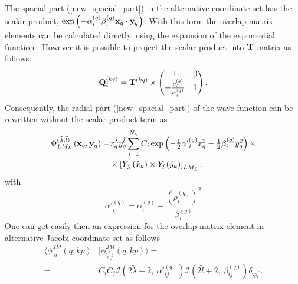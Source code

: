 \documentclass[
12pt, %
oneside, %
english, %
onehalfspacing, %
onehalfspacing, %
headsepline, %
]{MastersDoctoralThesis} %
\begin{document}
The spacial part (\ref{new_spacial_part}) in the alternative coordinate set has the scalar product, $\exp \left(- \alpha_i^{(q)} \beta_i^{(q)}  {\bf x}_q \cdot {\bf y}_q  \right)$. With this form the overlap matrix elements can be calculated directly, using the expansion of the exponential function \cite{suzuki1998stochastic}. However it is possible  to project the scalar product into ${\bf T}$ matrix \cite{kukulin1990dynamic} as follows:
 \begin{equation}
{\bf Q}_i^{(kq)}= {\bf T}^{(kq)} \times
\begin{pmatrix}
1 &  0 \\ 
-\tfrac{\rho^{(q)}_{i}}{\alpha^{(q)}_i} & 1
\end{pmatrix} .
\label{q_rotation_matrix}
\end{equation}
Consequently, the radial part (\ref{new_spacial_part}) of the wave function can be rewritten without the scalar product term as
\begin{align}
 \Phi_{LM_L}^{(\tilde{\lambda},\tilde{l}) } \left(  {\bf x}_q, {\bf y}_q \right)  =  &
x^{\tilde{\lambda}}_q y^{\tilde{l}}_q 
\sum_{i=1}^{N_\gamma} C_i 
\exp\left( - \tfrac{1}{2} 
{\alpha'}^{(q)}_{i}
 x^2_q -\tfrac{1}{2}  \beta_i^{(q)} y^2_q \right)
\times \nonumber \\
& \times \left[ 
Y_{\tilde{\lambda}} \left(\hat{x}_k \right) \times Y_{\tilde{l}} \left(\hat{y}_k \right)
\right]_{LM_L}.
\label{new_spacial_part}
\end{align}
with 
\begin{equation}
{\alpha'}^{(q)}_{i}=
\alpha^{(q)}_{i}-\frac{\left(\rho^{(q)}_{i}{}\right)^2}{\beta^{(q)}_{i}}
\end{equation}
One can get easily then an expression for the overlap matrix element in alternative Jacobi coordinate set as follows
\begin{align}
\langle \phi^{JM}_{\tilde{\gamma}i}\left(q,kp \right) & \vert 
\phi^{JM}_{\tilde{\gamma}^{\prime}j}\left(q,kp \right) \rangle =
 \label{matrix_element_alter_set} \\
=& 
 C_i C_j
 \mathcal{I} \left( 2 \tilde{\lambda}+2,~
\alpha'^{(q)}_{ij}
  \right)
\mathcal{I} \left( 2 \tilde{l}+2, ~
\beta_{ij}^{(q)} \right)
  \delta_{\tilde{\gamma}\tilde{\gamma}^{\prime}}. \nonumber
\end{align}
\end{document}
